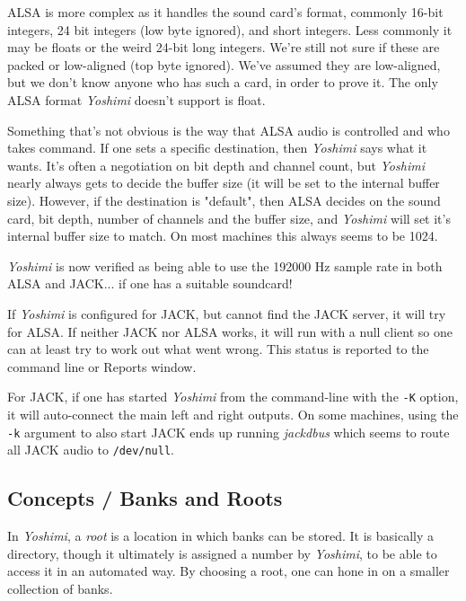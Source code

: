    ALSA is more complex as it handles the sound card's format, commonly
   16-bit integers, 24 bit integers (low byte ignored), and short integers.
   Less commonly it may be floats or the weird 24-bit long integers. We're
   still not sure if these are packed or low-aligned (top byte ignored). We've
   assumed they are low-aligned, but we don't know anyone who has such a card,
   in order to prove it.  The only ALSA format
   \textsl{Yoshimi} doesn't support is float.

   Something that's not obvious is the way that ALSA audio is controlled and who
   takes command.  If one sets a specific destination, then \textsl{Yoshimi}
   says what it wants. It's often a negotiation on bit depth and channel count,
   but \textsl{Yoshimi} nearly always gets to decide the buffer size (it will be
   set to the internal buffer size).  However, if the destination is "default",
   then ALSA decides on the sound card, bit depth, number of channels and the
   buffer size, and \textsl{Yoshimi} will set it's internal buffer size to
   match.  On most machines this always seems to be 1024.

   \textsl{Yoshimi} is now verified as being able to use the 192000 Hz sample
   rate in both ALSA and JACK... if one has a suitable soundcard!

   If \textsl{Yoshimi} is configured for JACK, but cannot find the JACK server,
   it will try for ALSA. If neither JACK nor ALSA works, it will run with a null
   client so one can at least try to work out what went wrong.
   This status is reported to the command line or Reports window.

   For JACK, if one has started \textsl{Yoshimi}
   from the command-line with the \texttt{-K} option, it will
   auto-connect the main left and right outputs.
   On some machines, using the \texttt{-k} argument to also start JACK
   ends up running \textsl{jackdbus} which seems to route all JACK audio
   to \texttt{/dev/null}.

\subsection{Concepts / Banks and Roots}
\label{subsec:concepts_banks_and_roots}

   In \textsl{Yoshimi}, a \textsl{root} is a location in which banks can be
   stored.  It is basically a directory, though it ultimately is assigned a
   number by \textsl{Yoshimi}, to be able to access it in an
   automated way.  By choosing a root, one can hone in on a smaller
   collection of banks.

